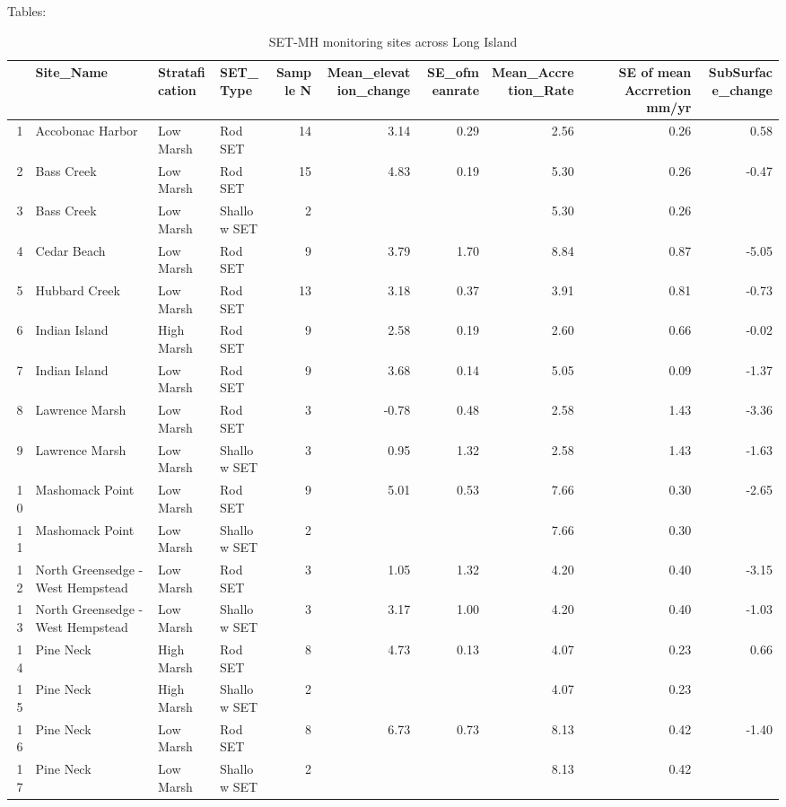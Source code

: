 \documentclass{article}\usepackage[]{graphicx}\usepackage[]{color}
\begin{document}
Tables:
\begin{table}[ht]
\centering
\begin{tabular}{rlllrrrrrr}
  \hline
 & Site\_Name & Stratafication & SET\_Type & Sample N & Mean\_elevation\_change & SE\_ofmeanrate & Mean\_Accretion\_Rate & SE of mean Accrretion mm/yr & SubSurface\_change \\ 
  \hline
1 & Accobonac Harbor & Low Marsh & Rod SET &  14 & 3.14 & 0.29 & 2.56 & 0.26 & 0.58 \\ 
  2 & Bass Creek & Low Marsh & Rod SET &  15 & 4.83 & 0.19 & 5.30 & 0.26 & -0.47 \\ 
  3 & Bass Creek & Low Marsh & Shallow SET &   2 &  &  & 5.30 & 0.26 &  \\ 
  4 & Cedar Beach & Low Marsh & Rod SET &   9 & 3.79 & 1.70 & 8.84 & 0.87 & -5.05 \\ 
  5 & Hubbard Creek & Low Marsh & Rod SET &  13 & 3.18 & 0.37 & 3.91 & 0.81 & -0.73 \\ 
  6 & Indian Island & High Marsh & Rod SET &   9 & 2.58 & 0.19 & 2.60 & 0.66 & -0.02 \\ 
  7 & Indian Island & Low Marsh & Rod SET &   9 & 3.68 & 0.14 & 5.05 & 0.09 & -1.37 \\ 
  8 & Lawrence Marsh & Low Marsh & Rod SET &   3 & -0.78 & 0.48 & 2.58 & 1.43 & -3.36 \\ 
  9 & Lawrence Marsh & Low Marsh & Shallow SET &   3 & 0.95 & 1.32 & 2.58 & 1.43 & -1.63 \\ 
  10 & Mashomack Point & Low Marsh & Rod SET &   9 & 5.01 & 0.53 & 7.66 & 0.30 & -2.65 \\ 
  11 & Mashomack Point & Low Marsh & Shallow SET &   2 &  &  & 7.66 & 0.30 &  \\ 
  12 & North Greensedge - West Hempstead & Low Marsh & Rod SET &   3 & 1.05 & 1.32 & 4.20 & 0.40 & -3.15 \\ 
  13 & North Greensedge - West Hempstead & Low Marsh & Shallow SET &   3 & 3.17 & 1.00 & 4.20 & 0.40 & -1.03 \\ 
  14 & Pine Neck & High Marsh & Rod SET &   8 & 4.73 & 0.13 & 4.07 & 0.23 & 0.66 \\ 
  15 & Pine Neck & High Marsh & Shallow SET &   2 &  &  & 4.07 & 0.23 &  \\ 
  16 & Pine Neck & Low Marsh & Rod SET &   8 & 6.73 & 0.73 & 8.13 & 0.42 & -1.40 \\ 
  17 & Pine Neck & Low Marsh & Shallow SET &   2 &  &  & 8.13 & 0.42 &  \\ 
   \hline
\end{tabular}
\caption{SET-MH monitoring sites across Long Island} 
\end{table}
\end{document}
